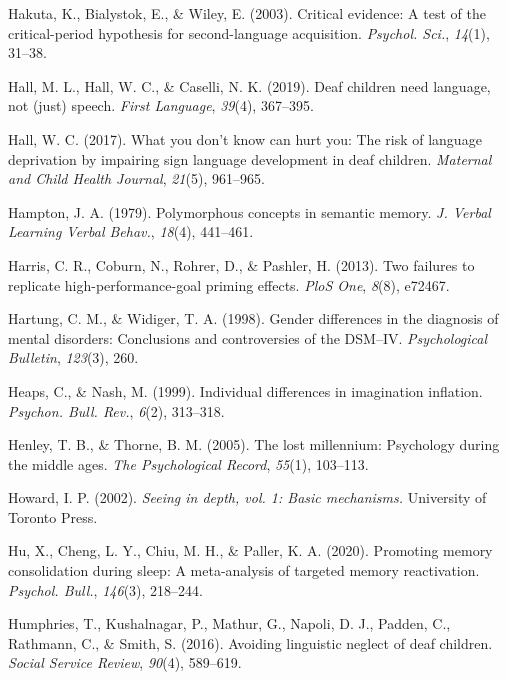 \documentclass[
]{krantz}
\newlength{\cslhangindent}
\newenvironment{CSLReferences}[2] %
 {\begin{list}{}{%
  \setlength{\itemindent}{0pt}
  \setlength{\leftmargin}{0pt}
  \setlength{\parsep}{0pt}
  \ifodd #1
   \setlength{\leftmargin}{\cslhangindent}
   \setlength{\itemindent}{-1\cslhangindent}
  \fi
  \setlength{\itemsep}{#2\baselineskip}}}
 {\end{list}}
\begin{document}
\begin{CSLReferences}{1}{0}
Hakuta, K., Bialystok, E., \& Wiley, E. (2003). Critical evidence: A test of the critical-period hypothesis for second-language acquisition. \emph{Psychol. Sci.}, \emph{14}(1), 31--38.

Hall, M. L., Hall, W. C., \& Caselli, N. K. (2019). Deaf children need language, not (just) speech. \emph{First Language}, \emph{39}(4), 367--395.

Hall, W. C. (2017). What you don't know can hurt you: The risk of language deprivation by impairing sign language development in deaf children. \emph{Maternal and Child Health Journal}, \emph{21}(5), 961--965.

Hampton, J. A. (1979). Polymorphous concepts in semantic memory. \emph{J. Verbal Learning Verbal Behav.}, \emph{18}(4), 441--461.

Harris, C. R., Coburn, N., Rohrer, D., \& Pashler, H. (2013). Two failures to replicate high-performance-goal priming effects. \emph{PloS One}, \emph{8}(8), e72467.

Hartung, C. M., \& Widiger, T. A. (1998). Gender differences in the diagnosis of mental disorders: Conclusions and controversies of the DSM--IV. \emph{Psychological Bulletin}, \emph{123}(3), 260.

Heaps, C., \& Nash, M. (1999). Individual differences in imagination inflation. \emph{Psychon. Bull. Rev.}, \emph{6}(2), 313--318.

Henley, T. B., \& Thorne, B. M. (2005). The lost millennium: Psychology during the middle ages. \emph{The Psychological Record}, \emph{55}(1), 103--113.

Howard, I. P. (2002). \emph{Seeing in depth, vol. 1: Basic mechanisms.} University of Toronto Press.

Hu, X., Cheng, L. Y., Chiu, M. H., \& Paller, K. A. (2020). Promoting memory consolidation during sleep: A meta-analysis of targeted memory reactivation. \emph{Psychol. Bull.}, \emph{146}(3), 218--244.

Humphries, T., Kushalnagar, P., Mathur, G., Napoli, D. J., Padden, C., Rathmann, C., \& Smith, S. (2016). Avoiding linguistic neglect of deaf children. \emph{Social Service Review}, \emph{90}(4), 589--619.


\end{CSLReferences}
\end{document}
